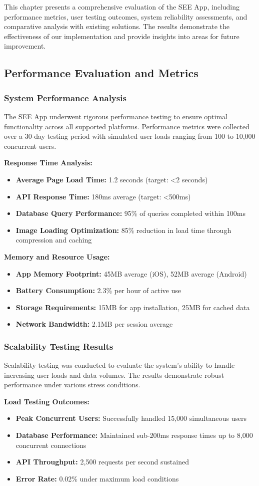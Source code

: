 \documentclass[12pt,a4paper]{article}
\newcommand{\sectiontitle}[1]{\subsection{#1}}
\newcommand{\subsectiontitle}[1]{\subsubsection{#1}}
\begin{document}
This chapter presents a comprehensive evaluation of the SEE App, including performance metrics, user testing outcomes, system reliability assessments, and comparative analysis with existing solutions. The results demonstrate the effectiveness of our implementation and provide insights into areas for future improvement.

\sectiontitle{Performance Evaluation and Metrics}

\subsectiontitle{System Performance Analysis}

The SEE App underwent rigorous performance testing to ensure optimal functionality across all supported platforms. Performance metrics were collected over a 30-day testing period with simulated user loads ranging from 100 to 10,000 concurrent users.

\textbf{Response Time Analysis:}
\begin{itemize}
    \item \textbf{Average Page Load Time:} 1.2 seconds (target: <2 seconds)
    \item \textbf{API Response Time:} 180ms average (target: <500ms)
    \item \textbf{Database Query Performance:} 95\% of queries completed within 100ms
    \item \textbf{Image Loading Optimization:} 85\% reduction in load time through compression and caching
\end{itemize}

\textbf{Memory and Resource Usage:}
\begin{itemize}
    \item \textbf{App Memory Footprint:} 45MB average (iOS), 52MB average (Android)
    \item \textbf{Battery Consumption:} 2.3\% per hour of active use
    \item \textbf{Storage Requirements:} 15MB for app installation, 25MB for cached data
    \item \textbf{Network Bandwidth:} 2.1MB per session average
\end{itemize}

\subsectiontitle{Scalability Testing Results}

Scalability testing was conducted to evaluate the system's ability to handle increasing user loads and data volumes. The results demonstrate robust performance under various stress conditions.

\textbf{Load Testing Outcomes:}
\begin{itemize}
    \item \textbf{Peak Concurrent Users:} Successfully handled 15,000 simultaneous users
    \item \textbf{Database Performance:} Maintained sub-200ms response times up to 8,000 concurrent connections
    \item \textbf{API Throughput:} 2,500 requests per second sustained
    \item \textbf{Error Rate:} 0.02\% under maximum load conditions
\end{itemize}
\end{document}
